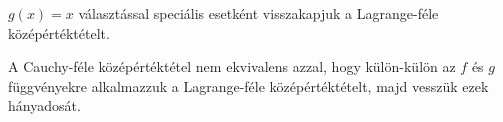 \begin{note}
  $g(x) = x$ választással speciális esetként visszakapjuk a Lagrange-féle
  középértéktételt.
\end{note}

\begin{note}
  A Cauchy-féle középértéktétel nem ekvivalens azzal, hogy külön-külön az
  $f$ és $g$ függvényekre alkalmazzuk a Lagrange-féle középértéktételt,
  majd vesszük ezek hányadosát.
\end{note}